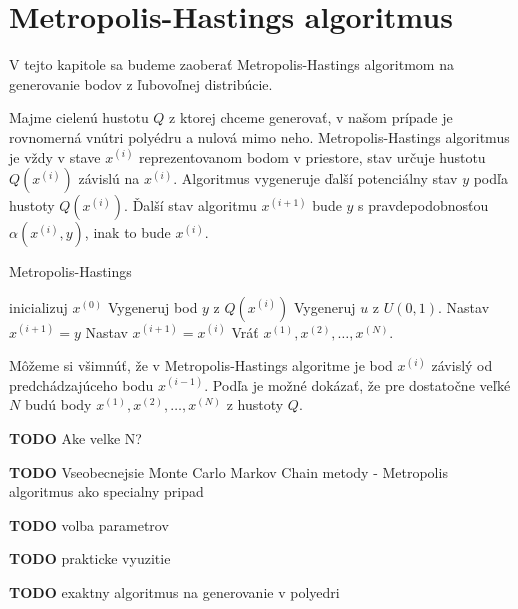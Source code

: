 \chapter{Metropolis-Hastings algoritmus}

V tejto kapitole sa budeme zaoberať Metropolis-Hastings algoritmom na generovanie bodov z ľubovoľnej distribúcie. 

Majme cielenú hustotu $Q$ z ktorej chceme generovať, v našom prípade je rovnomerná vnútri polyédru a nulová mimo neho. Metropolis-Hastings algoritmus je vždy v stave $x^{(i)}$ reprezentovanom bodom v priestore, stav určuje hustotu $Q(x^{(i)})$ závislú na $x^{(i)}$. Algoritmus vygeneruje ďalší potenciálny stav $y$ podľa hustoty $Q(x^{(i)})$. Ďalší stav algoritmu $x^{(i+1)}$ bude $y$ s pravdepodobnosťou $\alpha (x^{(i)},y)$, inak to bude $x^{(i)}$.

\begin{algorithm}[H]
	\caption{Metropolis-Hastings \cite{chib_understanding_1995}}
	\label{metropolis-hastings}
	\begin{algorithmic}[1]
		\State inicializuj $x^{(0)}$
			\State Vygeneruj bod $y$ z $Q(x^{(i)})$
			\State Vygeneruj $u$ z $U(0,1)$.
				\State Nastav $x^{(i+1)}=y$
			\Else
				\State Nastav $x^{(i+1)}=x^{(i)}$
			\EndIf
		\EndFor
		\State Vráť ${x^{(1)},x^{(2)},\dots,x^{(N)}}$.
	\end{algorithmic}
\end{algorithm}

Môžeme si všimnúť, že v Metropolis-Hastings algoritme je bod $x^{(i)}$ závislý od predchádzajúceho bodu $x^{(i-1)}$. Podľa \cite{chib_understanding_1995} je možné dokázať, že pre dostatočne veľké $N$ budú body ${x^{(1)},x^{(2)},\dots,x^{(N)}}$ z hustoty $Q$.

\textbf{TODO} Ake velke N?

\textbf{TODO} Vseobecnejsie Monte Carlo Markov Chain metody - Metropolis algoritmus ako specialny pripad

\textbf{TODO} volba parametrov

\textbf{TODO} prakticke vyuzitie

\textbf{TODO} exaktny algoritmus na generovanie v polyedri
